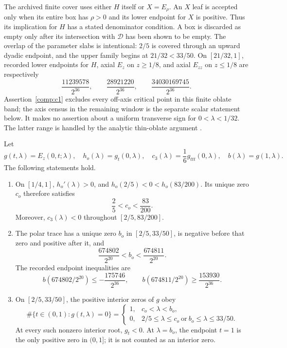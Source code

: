 The archived finite cover uses either $H$ itself or $X=E_\rho$.
An $X$ leaf is accepted only when its entire box has $\rho>0$ and
its lower endpoint for $X$ is positive.  Thus its implication for $H$
has a stated denominator condition.  A box is discarded as empty only
after its intersection with $\mathcal D$ has been shown to be empty.
The overlap of the parameter slabs is intentional: $2/5$ is covered
through an upward dyadic endpoint, and the upper family begins at
$21/32<33/50$.
On $[21/32,1]$, recorded lower endpoints for $H$, axial $E_z$
on $z\geq1/8$, and axial $E_{zz}$ on $z\leq1/8$ are respectively
\[
 \frac{11239578}{2^{36}},\qquad
 \frac{28921220}{2^{36}},\qquad
 \frac{34030169745}{2^{36}}.
\]
Assertion~\ref{comp:c1} excludes every off-axis critical point in this
finite oblate band; the axis census in the remaining window is the
separate scalar statement below.  It makes no assertion about a uniform
transverse sign for $0<\lambda<1/32$.
The latter range is handled by the analytic thin-oblate argument \citep{data-oblate-full}.

\begin{computationalassertion}
\label{comp:c2}
Let
\[
 g(t,\lambda)=E_z(0,t;\lambda),\quad
 h_o(\lambda)=g_t(0,\lambda),\quad
 c_3(\lambda)=\frac16 g_{ttt}(0,\lambda),\quad
 b(\lambda)=g(1,\lambda).
\]
The following statements hold.
\begin{enumerate}
 \item On $[1/4,1]$, $h_o'(\lambda)>0$, and
 $h_o(2/5)<0<h_o(83/200)$.  Its unique zero $c_o$ therefore satisfies
 \[
  \frac25<c_o<\frac{83}{200}.
 \]
 Moreover, $c_3(\lambda)<0$ throughout $[2/5,83/200]$.
 \item The polar trace has a unique zero $b_o$ in $[2/5,33/50]$,
 is negative before that zero and positive after it, and
 \[
  \frac{674802}{2^{20}}<b_o<\frac{674811}{2^{20}}.
 \]
 The recorded endpoint inequalities are
 \[
  b(674802/2^{20})\leq-\frac{175746}{2^{36}},\qquad
  b(674811/2^{20})\geq\frac{153930}{2^{36}}.
 \]
 \item On $[2/5,33/50]$, the positive interior zeros of $g$ obey
 \[
  \#\{t\in(0,1):g(t,\lambda)=0\}
  =\begin{cases}
    1,&c_o<\lambda<b_o,\\
    0,&2/5\leq\lambda\leq c_o\ \text{or}\ b_o\leq\lambda\leq33/50.
   \end{cases}
 \]
 At every such nonzero interior root, $g_t<0$.
 At $\lambda=b_o$, the endpoint $t=1$ is the only positive zero
 in $(0,1]$; it is not counted as an interior zero.
\end{enumerate}
\end{computationalassertion}

